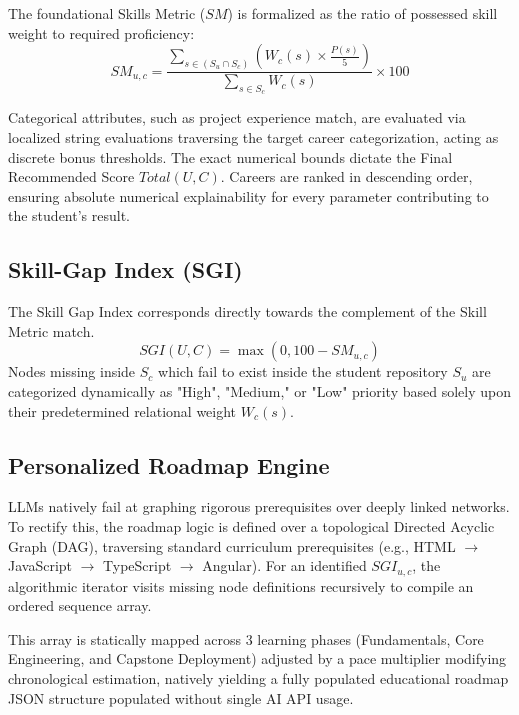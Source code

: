 \documentclass[conference]{IEEEtran}
\begin{document}
The foundational Skills Metric ($SM$) is formalized as the ratio of possessed skill weight to required proficiency:
\begin{equation}
SM_{u,c} = \frac{\sum_{s \in (S_u \cap S_c)} \left( W_c(s) \times \frac{P(s)}{5} \right)}{\sum_{s \in S_c} W_c(s)} \times 100
\end{equation}

Categorical attributes, such as project experience match, are evaluated via localized string evaluations traversing the target career categorization, acting as discrete bonus thresholds. The exact numerical bounds dictate the Final Recommended Score $Total(U, C)$. Careers are ranked in descending order, ensuring absolute numerical explainability for every parameter contributing to the student's result.

\subsection{Skill-Gap Index (SGI)}
The Skill Gap Index corresponds directly towards the complement of the Skill Metric match.
\begin{equation}
SGI(U, C) = \max(0, 100 - SM_{u,c})
\end{equation}
Nodes missing inside $S_c$ which fail to exist inside the student repository $S_u$ are categorized dynamically as "High", "Medium," or "Low" priority based solely upon their predetermined relational weight $W_c(s)$.

\subsection{Personalized Roadmap Engine}
LLMs natively fail at graphing rigorous prerequisites over deeply linked networks. To rectify this, the roadmap logic is defined over a topological Directed Acyclic Graph (DAG), traversing standard curriculum prerequisites (e.g., HTML $\rightarrow$ JavaScript $\rightarrow$ TypeScript $\rightarrow$ Angular). For an identified $SGI_{u,c}$, the algorithmic iterator visits missing node definitions recursively to compile an ordered sequence array. 

This array is statically mapped across 3 learning phases (Fundamentals, Core Engineering, and Capstone Deployment) adjusted by a pace multiplier modifying chronological estimation, natively yielding a fully populated educational roadmap JSON structure populated without single AI API usage.
\end{document}
